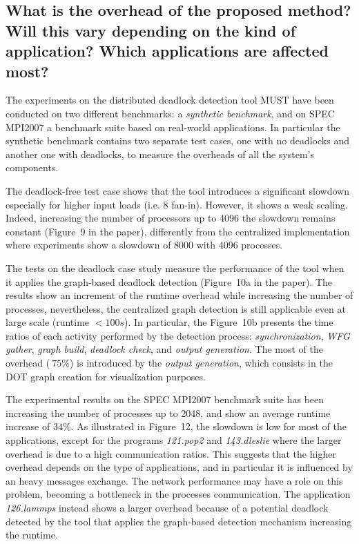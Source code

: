 \begin{refsection}
\subsection*{What is the overhead of the proposed method?
  Will this vary depending on
  the kind of application?
  Which applications are affected most?}
\label{sec:member34}

The experiments on the distributed deadlock detection tool MUST have been
conducted on two different benchmarks: a \emph{synthetic benchmark}, and on
SPEC MPI2007 a benchmark suite based on real-world applications.
%
In particular the synthetic benchmark contains two separate test cases, one
with no deadlocks  and another one with deadlocks, to measure the overheads of
all the system's components.

The deadlock-free test case shows that the tool introduces a significant
slowdown especially for higher input loads (i.e. 8 fan-in).
%
However, it shows a weak scaling.
%
Indeed, increasing the number of processors up to 4096 the slowdown remains
constant (Figure~9 in the paper), differently from the centralized
implementation where experiments show a slowdown of 8000 with 4096
processes.

The tests on the deadlock case study measure the performance of the tool when
it applies the graph-based deadlock detection (Figure~10a in the paper).
%
The results show an increment of the runtime overhead while increasing the
number of processes, nevertheless, the centralized graph detection is still
applicable even at large scale (runtime $<100s$).
%
In particular, the Figure~10b presents the time ratios of each activity
performed by the detection process: \emph{synchronization}, \emph{WFG gather},
\emph{graph build}, \emph{deadlock check}, and \emph{output generation}.
%
The most of the overhead ($~75\%$) is introduced by the \emph{output
  generation}, which consists in the DOT graph creation for visualization
purposes.

The experimental results on the SPEC MPI2007 benchmark suite has been
increasing the number of processes up to 2048, and show an average runtime
increase of $34\%$.
%
As illustrated in Figure~12, the slowdown is low for most of the
applications, except for the programs \emph{121.pop2} and \emph{143.dleslie}
where the larger overhead is due to a high communication ratios.
%
This suggests that the higher overhead depends on the type of applications,
and in particular it is influenced by an heavy messages exchange.
%
The network performance may have a role on this problem, becoming a bottleneck
in the processes communication.
%
The application \emph{126.lammps} instead shows a larger overhead because of a
potential deadlock detected by the tool that applies the graph-based detection
mechanism increasing the runtime.

\printbibliography

\end{refsection}

